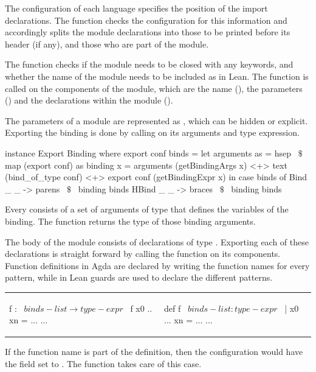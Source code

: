 The configuration of each language specifies the position of the import declarations. The function  checks the configuration for this information and accordingly splits the module declarations into those to be printed before its header (if any), and those who are part of the module. 

The   function checks if the module needs to be closed with any keywords, and whether the name of the module needs to be included as in Lean. The  function is called on the components of the module, which are the name (), the parameters () and the declarations within the module (). 

The parameters of a module are represented as \lstmath{[Binding]}, which can be hidden or explicit. Exporting the binding is done by calling  on its arguments and type expression.  
\begin{hscode}
instance Export Binding where
  export conf binds =
    let arguments as = hsep ~$\$$~ map (export conf) as
        binding x =  
          arguments (getBindingArgs x) <+> text (bind_of_type conf) 
          <+> export conf (getBindingExpr x)
    in case binds of
      Bind  _ _ -> parens ~$\$$~ binding binds
      HBind _ _ -> braces ~$\$$~ binding binds

\end{hscode}
Every  consists of a set of arguments of type  that defines the variables of the binding. The function  returns the type of those binding arguments. 

The body of the module consists of declarations of type \lstmath{[Decl]}. Exporting each of these declarations is straight forward by calling the  function on its components. Function definitions in Agda are declared by writing the function names for every pattern, while in Lean guards are used to declare the different patterns. 
\newline
\begin{tabular}{p{18em} p{10em}}
\begin{agdacode} 
f : ~$binds-list \to type-expr$~   
f x0 .. xn = ... 
...    
\end{agdacode}  
&
\begin{leancode}
def f ~$binds-list : type-expr$~ 
| x0 ... xn = ... 
... 
\end{leancode}
\end{tabular}
\newline
If the function name is part of the definition, then the configuration would have the field  set to . The function  takes care of this case. 

